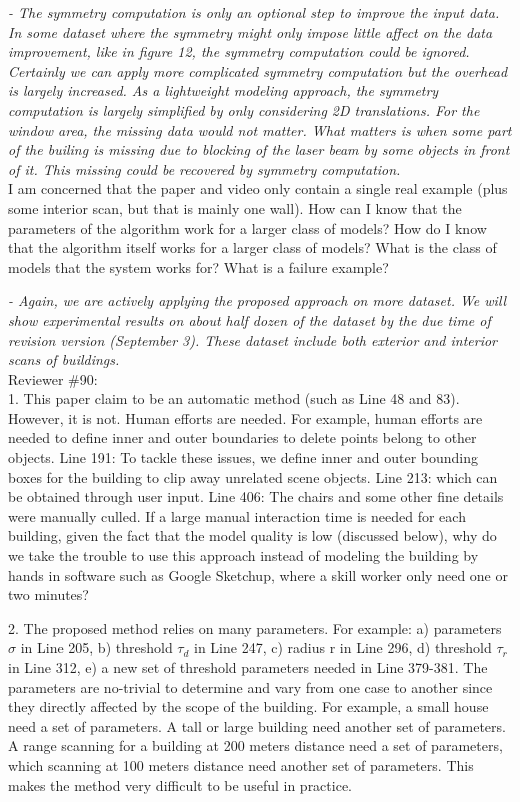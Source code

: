 \documentclass[12pt,letterpaper]{article}
\begin{document}
{\it - The symmetry computation is only an optional step to improve the input data. In some dataset where
the symmetry might only impose little affect on the data improvement, like in figure 12, 
the symmetry computation could be ignored.
Certainly we can apply more complicated symmetry computation but the overhead is largely increased.
As a lightweight modeling approach, the symmetry computation is largely simplified by only
considering 2D translations. 
For the window area, the missing data would not matter. What matters is when some part of the builing
is missing due to blocking of the laser beam by some objects in front of it. This missing could be
recovered by symmetry computation.
}\\

I am concerned that the paper and video only contain a single
real example (plus some interior scan, but that is mainly one wall).
How can I know that the parameters of the algorithm work
for a larger class of models? How do I know that the
algorithm itself works for a larger class of models?
What is the class of models that the system works for?
What is a failure example?

{ \it - Again, we are actively applying the proposed approach on more dataset. 
We will show experimental results on about half dozen of the dataset by the due time of revision version (September 3). 
These dataset include both exterior and interior scans of buildings.}\\

Reviewer \#90:\\

1. This paper claim to be an automatic method (such as Line 48 and 83). However, it is
not. Human efforts are needed. For example, human efforts are needed to define inner
and outer boundaries to delete points belong to other objects. Line 191: To tackle
these issues, we define inner and outer bounding boxes for the building to clip away
unrelated scene objects. Line 213: which can be obtained through user input. Line 406:
The chairs and some other fine details were manually culled. If a large manual
interaction time is needed for each building, given the fact that the model quality is
low (discussed below), why do we take the trouble to use this approach instead of
modeling the building by hands in software such as Google Sketchup, where a skill
worker only need one or two minutes?

2. The proposed method relies on many parameters. For example:
a) parameters $\sigma$ in Line 205,
b) threshold $\tau_d$ in Line 247,
c) radius r in Line 296,
d) threshold $\tau_r$ in Line 312,
e) a new set of threshold parameters needed in Line 379-381.
The parameters are no-trivial to determine and vary from one case to another since
they directly affected by the scope of the building. For example, a small house need a
set of parameters. A tall or large building need another set of parameters. A range
scanning for a building at 200 meters distance need a set of parameters, which
scanning at 100 meters distance need another set of parameters. This makes the method
very difficult to be useful in practice.
\end{document}
